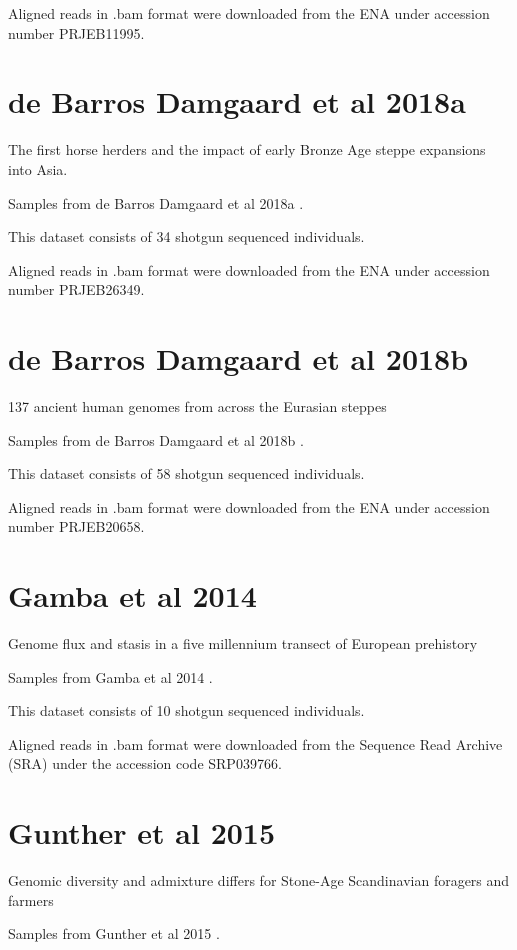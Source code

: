 Aligned reads in .bam format were downloaded from the ENA under accession number PRJEB11995.

\section{de Barros Damgaard et al 2018a}

The first horse herders and the impact of early Bronze Age steppe expansions into Asia.

Samples from de Barros Damgaard et al 2018a \cite{deBarrosDamgaardeaar7711}.

This dataset consists of 34 shotgun sequenced individuals.

Aligned reads in .bam format were downloaded from the ENA under accession number PRJEB26349.

\section{de Barros Damgaard et al 2018b}

137 ancient human genomes from across the Eurasian steppes

Samples from de Barros Damgaard et al 2018b \cite{de2018137}.

This dataset consists of 58 shotgun sequenced individuals.

Aligned reads in .bam format were downloaded from the ENA under accession number PRJEB20658.

\section{Gamba et al 2014}

Genome flux and stasis in a five millennium transect of European prehistory

Samples from  Gamba et al 2014 \cite{Gamba2014}.

This dataset consists of 10 shotgun sequenced individuals.

Aligned reads in .bam format were downloaded from the Sequence Read Archive (SRA) under the accession code SRP039766.

\section{Gunther et al 2015}

Genomic diversity and admixture differs for Stone-Age Scandinavian foragers and farmers

Samples from Gunther et al 2015 \cite{gunther2015ancient}.

